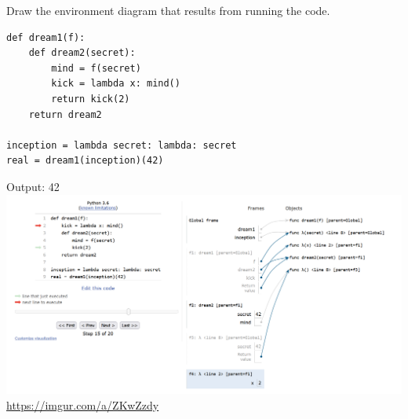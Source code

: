 \begin{blocksection}
\question Draw the environment diagram that results from running the code.

\begin{lstlisting}
def dream1(f):
    def dream2(secret):
        mind = f(secret)
        kick = lambda x: mind()
        return kick(2)
    return dream2

inception = lambda secret: lambda: secret
real = dream1(inception)(42)
\end{lstlisting}

\pagebreak

\begin{solution}[2in]
Output: 42 \newline
\includegraphics[scale=0.5]{newInception.png}
\newline
\url{https://imgur.com/a/ZKwZzdy}
\end{solution}
\end{blocksection}
